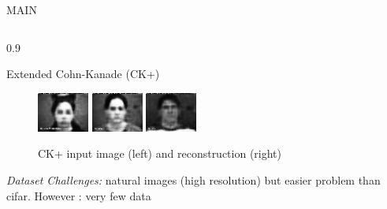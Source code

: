 \documentclass[final]{beamer}
\newlength{\onecolwid}
\newlength{\threecolwid}
\begin{document}
\begin{frame}[t]
\begin{columns}[t]
\begin{column}{\threecolwid}
\begin{alertblock}{MAIN}
\begin{columns}[t, totalwidth=0.9\threecolwid]
\begin{column}{0.9\onecolwid}
\begin{block}{Extended Cohn-Kanade (CK+)}
\begin{figure}
\includegraphics[width=0.3\linewidth]{graphics/reconstructions/ckplus/reconstruction_00.png}
\includegraphics[width=0.3\linewidth]{graphics/reconstructions/ckplus/reconstruction_01.png}
\includegraphics[width=0.3\linewidth]{graphics/reconstructions/ckplus/reconstruction_02.png}

\caption{CK+ input image (left) and reconstruction (right)}
\end{figure}

\emph{Dataset Challenges:}
natural images (high resolution) but easier problem than cifar. However : very few data

\end{block}

\end{column}

\end{columns}


\begin{columns}[t, totalwidth=0.9\threecolwid] %



\end{columns}
\end{alertblock}
\end{column}
\end{columns}
\end{frame}
\end{document}
